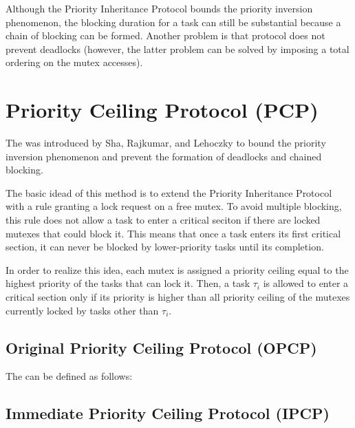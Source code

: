 Although the Priority Inheritance Protocol bounds the priority inversion phenomenon, the blocking duration for a task can still be substantial because a chain of blocking can be formed. Another problem is that protocol does not prevent deadlocks (however, the latter problem can be solved by imposing a total ordering on the mutex accesses).

\section{Priority Ceiling Protocol (PCP)} %
The  was introduced by Sha, Rajkumar, and Lehoczky to bound the priority inversion phenomenon and prevent the formation of deadlocks and chained blocking.

The basic idead of this method is to extend the Priority Inheritance Protocol with a rule granting a lock request on a free mutex. To avoid multiple blocking, this rule does not allow a task to enter a critical seciton if there are locked mutexes that could block it. This means that once a task enters its first critical section, it can never be blocked by lower-priority tasks until its completion.

In order to realize this idea, each mutex is assigned a priority ceiling equal to the highest priority of the tasks that can lock it. Then, a task $\tau_i$ is allowed to enter a critical section only if its priority is higher than all priority ceiling of the mutexes currently locked by tasks other than $\tau_i$.
\subsection{Original Priority Ceiling Protocol (OPCP)}

The  can be defined as follows:

\subsection{Immediate Priority Ceiling Protocol (IPCP)}
